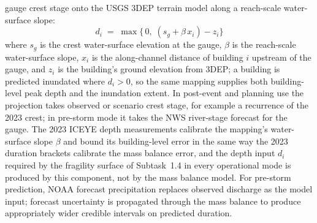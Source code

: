 \documentclass[11pt]{article}
\begin{document}
gauge crest stage onto the USGS 3DEP terrain model along a reach-scale
water-surface slope:
\begin{equation}\label{eq:stagedem}
  d_i \;=\; \max\bigl\{\,0,\; (s_g + \beta\, x_i) - z_i \bigr\}
\end{equation}
where $s_g$ is the crest water-surface elevation at the gauge, $\beta$ is the
reach-scale water-surface slope, $x_i$ is the along-channel distance of building
$i$ upstream of the gauge, and $z_i$ is the building's ground elevation from
3DEP; a building is predicted inundated where $d_i > 0$, so the same mapping
supplies both building-level peak depth and the inundation extent.
In post-event and planning use the projection takes observed or scenario crest
stage, for example a recurrence of the 2023 crest; in pre-storm mode it takes the
NWS river-stage forecast for the gauge.
The 2023 ICEYE depth measurements calibrate the mapping's water-surface slope
$\beta$ and bound its building-level error in
the same way the 2023 duration brackets calibrate the mass balance error, and the
depth input $d_i$ required by the fragility surface of Subtask~1.4 in every
operational mode is produced by this component, not by the mass balance model.
For pre-storm prediction, NOAA forecast precipitation replaces observed discharge
as the model input; forecast uncertainty is propagated through the mass balance to
produce appropriately wider credible intervals on predicted duration.
%
\end{document}
